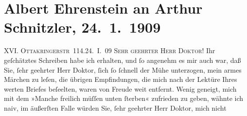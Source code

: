 

         
         \renewcommand{\erwaehntePersonen}{Personen: Albert Ehrenstein, Camill Hoffmann, Hugo von Hofmannsthal}
         \renewcommand{\erwaehnteInstitutionen}{Institutionen: Erdgeist, Neue Freie Presse}
         \renewcommand{\erwaehnteOrte}{Orte: Ottakringerstraße, Wien}
         \renewcommand{\erwaehnteWerke}{Werke: Die Zeit, Manche freilich, Tai-Gin}
               \section[Albert Ehrenstein an Arthur Schnitzler, 24. 1. 1909]{ Albert Ehrenstein an Arthur Schnitzler, 24. 1. 1909}\nopagebreak{}\rehead{ }\begin{ledgroupsized}[t]{13cm}\normalsize\beginnumbering{} \toendnotes[C]{\smallbreak\pagebreak[2]} 
\toendnotes[C]{\smallbreak}\pstart
           {\pb}XVI. \textsc{Ottakringerstr} 114.\hfill 24. I. 09\pend
           \pstart{}\textsc{Sehr geehrter Herr Doktor!}\pend\pstart
           Ihr geſchätztes Schreiben habe ich erhalten, und ſo angenehm es mir auch war, daß
               Sie, ſehr geehrter Herr Doktor, ſich ſo ſchnell der Mühe unterzogen, mein armes Märchen zu leſen, die übrigen
               Empfindungen, die mich nach der Lektüre Ihres werten Briefes beſeelten, waren von
               Freude weit entfernt. Wenig geneigt, mich mit dem »Manche freilich müſſen unten ſterben« zufrieden zu geben,
               wähnte ich naiv, im äußerſten Falle würden Sie, ſehr geehrter Herr Doktor, mich nicht

\end{ledgroupsized}
